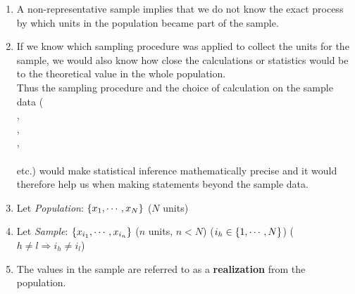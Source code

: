 \begin{enumerate}
    \item A non-representative sample implies that we do not know the exact process by which units in the population became part of the sample.
    \hfill \cite{statistics/book/Statistics-for-Data-Scientists/Maurits-Kaptein}

    \item If we know which sampling procedure was applied to collect the units for the sample, we would also know how close the calculations or statistics would be to the theoretical value in the whole population.
    \hfill \cite{statistics/book/Statistics-for-Data-Scientists/Maurits-Kaptein}
    \\
    Thus the sampling procedure and the choice of calculation on the sample data (\\
    , \\
    ,\\
    , \\
    \\
    etc.) would make statistical inference mathematically precise and it would therefore help us when making statements beyond the sample data.
    \hfill \cite{statistics/book/Statistics-for-Data-Scientists/Maurits-Kaptein}



    \vspace{0.5cm}

    \item Let \textit{Population}: $\left\{x_1, \cdots, x_N\right\}$ ($N$ units) 
    \hfill \cite{statistics/book/Statistics-for-Data-Scientists/Maurits-Kaptein}

    \item Let \textit{Sample}: $\left\{x_{i_1}, \cdots, x_{i_n}\right\}$ 
    ($n$ units, $n<N$) 
    ($i_h \in \left\{1, \cdots, N\right\}$)
    ($h \neq l \Rightarrow i_h \neq i_l$)
    \hfill \cite{statistics/book/Statistics-for-Data-Scientists/Maurits-Kaptein}

    \item The values in the sample are referred to as a \textbf{realization}\label{Sampling Plans/realization} from the population.
    \hfill \cite{statistics/book/Statistics-for-Data-Scientists/Maurits-Kaptein}

    
\end{enumerate}





